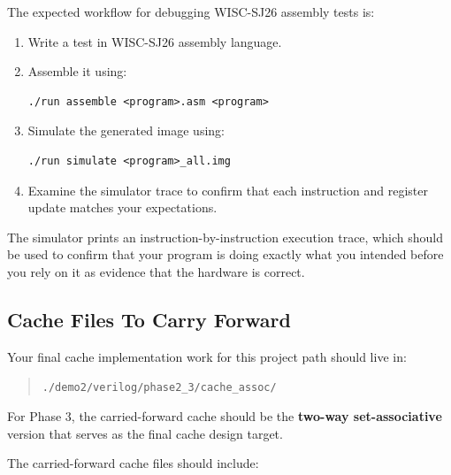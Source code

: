 \documentclass[12pt]{article}
\begin{document}
The expected workflow for debugging WISC-SJ26 assembly tests is:

\begin{enumerate}
\item Write a test in WISC-SJ26 assembly language.
\item Assemble it using:
\begin{verbatim}
./run assemble <program>.asm <program>
\end{verbatim}
\item Simulate the generated image using:
\begin{verbatim}
./run simulate <program>_all.img
\end{verbatim}
\item Examine the simulator trace to confirm that each instruction and register
update matches your expectations.
\end{enumerate}

The simulator prints an instruction-by-instruction execution trace, which should
be used to confirm that your program is doing exactly what you intended before
you rely on it as evidence that the hardware is correct.

\subsection*{Cache Files To Carry Forward}

Your final cache implementation work for this project path should live in:
\begin{quote}
\texttt{./demo2/verilog/phase2\_3/cache\_assoc/}
\end{quote}

For Phase 3, the carried-forward cache should be the \textbf{two-way set-associative}
version that serves as the final cache design target.

The carried-forward cache files should include:
\end{document}
